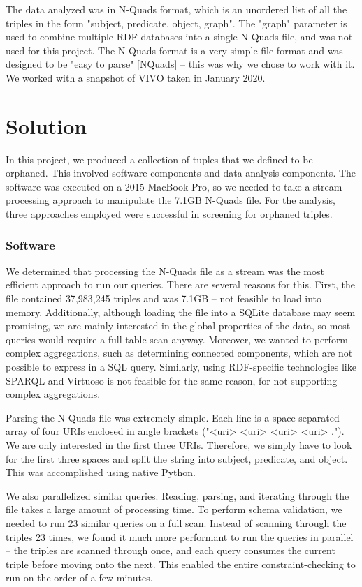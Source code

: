 \documentclass[11pt]{article}
\begin{document}
The data analyzed was in N-Quads format, which is an unordered list of all the triples in the form "subject, predicate, object, graph". The "graph" parameter is used to combine multiple RDF databases into a single N-Quads file, and was not used for this project. The N-Quads format is a very simple file format and was designed to be "easy to parse" [NQuads] -- this was why we chose to work with it. We worked with a snapshot of VIVO taken in January 2020.

\section*{Solution}
In this project, we produced a collection of tuples that we defined to be orphaned. This involved software components and data analysis components. The software was executed on a 2015 MacBook Pro, so we needed to take a stream processing approach to manipulate the 7.1GB N-Quads file. For the analysis, three approaches employed were successful in screening for orphaned triples.

\subsubsection*{Software}
We determined that processing the N-Quads file as a stream was the most efficient approach to run our queries. There are several reasons for this. First, the file contained 37,983,245 triples and was 7.1GB -- not feasible to load into memory. Additionally, although loading the file into a SQLite database may seem promising, we are mainly interested in the global properties of the data, so most queries would require a full table scan anyway. Moreover, we wanted to perform complex aggregations, such as determining connected components, which are not possible to express in a SQL query. Similarly, using RDF-specific technologies like SPARQL and Virtuoso is not feasible for the same reason, for not supporting complex aggregations.

Parsing the N-Quads file was extremely simple. Each line is a space-separated array of four URIs enclosed in angle brackets ("<uri> <uri> <uri> <uri> ."). We are only interested in the first three URIs. Therefore, we simply have to look for the first three spaces and split the string into subject, predicate, and object. This was accomplished using native Python.

We also parallelized similar queries. Reading, parsing, and iterating through the file takes a large amount of processing time. To perform schema validation, we needed to run 23 similar queries on a full scan. Instead of scanning through the triples 23 times, we found it much more performant to run the queries in parallel -- the triples are scanned through once, and each query consumes the current triple before moving onto the next. This enabled the entire constraint-checking to run on the order of a few minutes.
\end{document}
